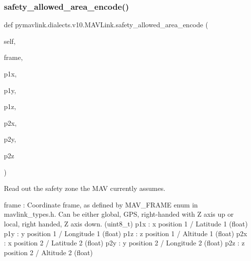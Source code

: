 \begin{DoxyVerb}
\begin{DoxyVerb}
\begin{DoxyVerb}
\begin{DoxyVerb}
\begin{DoxyVerb}
\begin{DoxyVerb}
\begin{DoxyVerb}
\begin{DoxyVerb}
\begin{DoxyVerb}
\begin{DoxyVerb}
\subsubsection{\texorpdfstring{safety\+\_\+allowed\+\_\+area\+\_\+encode()}{safety\_allowed\_area\_encode()}}
{\footnotesize\ttfamily def pymavlink.\+dialects.\+v10.\+M\+A\+V\+Link.\+safety\+\_\+allowed\+\_\+area\+\_\+encode (\begin{DoxyParamCaption}\item[{}]{self,  }\item[{}]{frame,  }\item[{}]{p1x,  }\item[{}]{p1y,  }\item[{}]{p1z,  }\item[{}]{p2x,  }\item[{}]{p2y,  }\item[{}]{p2z }\end{DoxyParamCaption})}

\begin{DoxyVerb}Read out the safety zone the MAV currently assumes.

frame                     : Coordinate frame, as defined by MAV_FRAME enum in mavlink_types.h. Can be either global, GPS, right-handed with Z axis up or local, right handed, Z axis down. (uint8_t)
p1x                       : x position 1 / Latitude 1 (float)
p1y                       : y position 1 / Longitude 1 (float)
p1z                       : z position 1 / Altitude 1 (float)
p2x                       : x position 2 / Latitude 2 (float)
p2y                       : y position 2 / Longitude 2 (float)
p2z                       : z position 2 / Altitude 2 (float)\end{DoxyVerb}
 \mbox{\label{classpymavlink_1_1dialects_1_1v10_1_1MAVLink_adff542695e56cd2979fa5556dc80c234}} 

\end{DoxyVerb}
\end{DoxyVerb}
\end{DoxyVerb}
\end{DoxyVerb}
\end{DoxyVerb}
\end{DoxyVerb}
\end{DoxyVerb}
\end{DoxyVerb}
\end{DoxyVerb}
\end{DoxyVerb}
